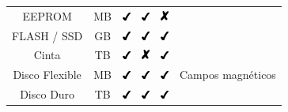 \begin{table}[H]
{\begin{tabular}{c|c|c|c|c|c}
\cline{1-5}
EEPROM & MB & \includegraphics[keepaspectratio=true, width=10px]{figures/Y} & \includegraphics[keepaspectratio=true, width=10px]{figures/Y} & \includegraphics[keepaspectratio=true, width=10px]{figures/N} &  \\
\cline{1-5}
FLASH / SSD & GB & \includegraphics[keepaspectratio=true, width=10px]{figures/Y} & \includegraphics[keepaspectratio=true, width=10px]{figures/Y} & \includegraphics[keepaspectratio=true, width=10px]{figures/Y} &  \\
\hline
Cinta & TB & \includegraphics[keepaspectratio=true, width=10px]{figures/Y} & \includegraphics[keepaspectratio=true, width=10px]{figures/N} & \includegraphics[keepaspectratio=true, width=10px]{figures/Y} & \multirow{3}{*}{Campos magn\'{e}ticos} \\
\cline{1-5}
Disco Flexible & MB & \includegraphics[keepaspectratio=true, width=10px]{figures/Y} & \includegraphics[keepaspectratio=true, width=10px]{figures/Y} & \includegraphics[keepaspectratio=true, width=10px]{figures/Y} &  \\
\cline{1-5}
Disco Duro & TB & \includegraphics[keepaspectratio=true, width=10px]{figures/Y} & \includegraphics[keepaspectratio=true, width=10px]{figures/Y} & \includegraphics[keepaspectratio=true, width=10px]{figures/Y} &  \\

\end{tabular}}
\end{table}
